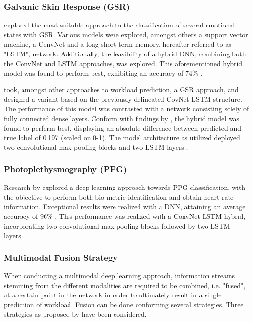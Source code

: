 \documentclass[12pt]{article}
\begin{document}
\subsubsection{Galvanic Skin Response (GSR)}
 explored the most suitable approach to the classification of several emotional states with GSR. Various models were explored, amongst others a support vector machine, a ConvNet and a long-short-term-memory, hereafter referred to as "LSTM", network. Additionally, the feasibility of a hybrid DNN, combining both the ConvNet and LSTM approaches, was explored. This aforementioned hybrid model was found to perform best, exhibiting an accuracy of 74\% \cite{sun2019hybrid}. 

 took, amongst other approaches to workload prediction,  a GSR approach, and designed a variant based on the previously delineated CovNet-LSTM structure. The performance of this model was contrasted with a network consisting solely of fully connected dense layers. Conform with findings by  , the hybrid model was found to perform best, displaying an absolute difference between predicted and true label of 0.197 (scaled on 0-1). The model architecture as utilized deployed two convolutional max-pooling blocks and two LSTM layers \cite{dolmans2020perceived}.

\subsubsection{Photoplethysmography (PPG)}
Research by  explored a deep learning approach towards PPG classification, with the objective to perform both bio-metric identification and obtain heart rate information. Exceptional results were realized with a DNN, attaining an average accuracy of 96\% \cite{biswas2019cornet}. This performance was realized with a ConvNet-LSTM hybrid, incorporating two convolutional max-pooling blocks followed by two LSTM layers. 

\subsubsection{Multimodal Fusion Strategy}  
When conducting a multimodal deep learning approach,  information streams stemming from the different modalities are required to be combined, i.e. "fused", at a certain point in the network in order to ultimately result in a single prediction of workload. Fusion can be done conforming several strategies. Three strategies as proposed by  have been considered.
\end{document}
